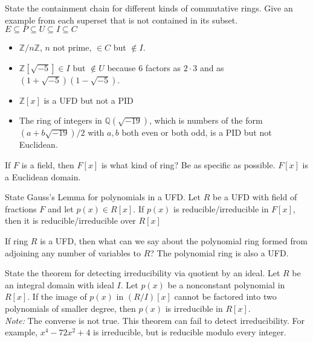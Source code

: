 \documentclass[avery5371,grid]{flashcards}
\newcommand{\Z}{\mathbb{Z}}
\newcommand{\Q}{\mathbb{Q}}
\begin{document}
\begin{flashcard}[Rings]{State the containment chain for different kinds of commutative rings. Give an example from each superset that is not contained in its subset.}
 $E \subseteq P \subseteq U \subseteq I \subseteq C$
 \begin{itemize}
      \item $\Z/n\Z$, $n$ not prime, $\in C$ but $\notin I$.
      \item $\Z[\sqrt{-5}] \in I$ but $\notin U$ because $6$ factors as $2 \cdot 3$ and as $(1+\sqrt{-5})(1-\sqrt{-5})$.
      \item $\Z[x]$ is a UFD but not a PID
      \item The ring of integers in $\Q(\sqrt{-19})$, which is numbers of the form $(a+b\sqrt{-19})/2$ with $a,b$ both even or both odd, is a PID but not Euclidean.
 \end{itemize}
\end{flashcard}

\begin{flashcard}[Rings]{If $F$ is a field, then $F[x]$ is what kind of ring? Be as specific as possible.}
 $F[x]$ is a Euclidean domain.
\end{flashcard}

\begin{flashcard}[Rings]{State Gauss's Lemma for  polynomials in a UFD.}
 Let $R$ be a UFD with field of fractions $F$ and let $p(x) \in R[x]$. If $p(x)$ is reducible/irreducible in $F[x]$, then it is reducible/irreducible over $R[x]$
\end{flashcard}

\begin{flashcard}[Rings]{If ring $R$ is a UFD, then what can we say about the polynomial ring formed from adjoining any number of variables to $R$?}
 The polynomial ring is also a UFD.
\end{flashcard}

\begin{flashcard}[Rings]{State the theorem for detecting irreducibility via quotient by an ideal.}
 Let $R$ be an integral domain with ideal $I$. Let $p(x)$ be a nonconstant polynomial in $R[x]$. If the image of $p(x)$ in $(R/I)[x]$ cannot be factored into two polynomials of smaller degree, then $p(x)$ is irreducible in $R[x]$.\\
 
 \emph{Note: }The converse is not true. This theorem can fail to detect irreducibility. For example, $x^4 - 72x^2 + 4$ is irreducible, but is reducible modulo every integer.
\end{flashcard}
\end{document}
